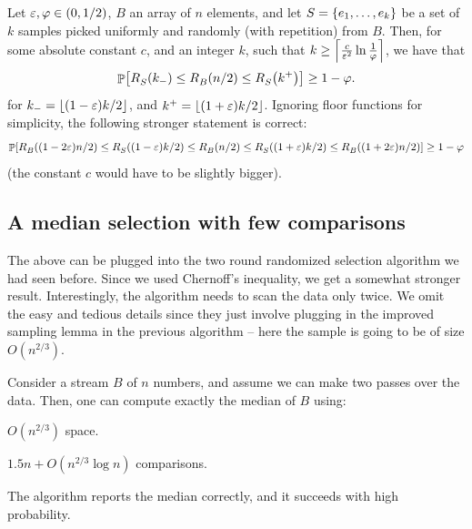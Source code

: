 \begin{lemma}
    Let ${\varepsilon}, \varphi \in (0,1/2)$, $B$ an array of $n$ elements, and let
    $S = \left\{ {e_1, \ldots, e_k} \right\}$ be a set of $k$ samples picked uniformly and
    randomly (with repetition) from $B$. Then, for some absolute constant
    $c$, and an integer $k$, such that
    $k\geq \left\lceil {\frac{c}{{\varepsilon}^2} \ln \frac{1}{\varphi}} \right\rceil $, we have that
    \begin{equation*}
        \Prob{%
           \rankY{S}{k_- }
           \leq
           \rankY{B}{n/2}
           \leq
           \rankY{S}{k^+} }
        \geq 1-\BadProb.
    \end{equation*}
    for $k_- = \left\lfloor {(1-{\varepsilon})k/2} \right\rfloor$, and $k^+ = \left\lfloor {(1+{\varepsilon})k/2} \right\rfloor$.  Ignoring
    floor functions for simplicity, the following stronger statement is correct:
    \begin{equation*}
        \Prob{%
           \rankY{B}{(1-2\eps)n/2}
           \leq %
           \rankY{S}{(1-\eps)k/2 }
           \leq
           \rankY{B}{n/2}
           \leq
           \rankY{S}{(1+\eps)k/2}
           \leq%
           \rankY{B}{(1+2\eps)n/2}
        }
      \geq 1-\BadProb        
    \end{equation*}
    (the constant $c$ would have to be slightly bigger).
\end{lemma}


\subsection{A median selection with few comparisons}

The above can be plugged into the two round randomized selection
algorithm we had seen before. Since we used Chernoff's inequality, we get
a somewhat stronger result. Interestingly, the algorithm needs to scan
the data only twice. We omit the easy and tedious details since they just
involve plugging in the improved sampling lemma in the previous
algorithm -- here the sample is going to be of size $O(n^{2/3})$.


\begin{lemma}
    Consider a stream $B$ of $n$ numbers, and assume we can make two
    passes over the data. Then, one can compute exactly the median of
    $B$ using:
    \begin{compactenumI}
        \item $O(n^{2/3})$ space.
        \item $1.5n + O(n^{2/3} \log n)$ comparisons.
    \end{compactenumI}
    The algorithm reports the median correctly, and it succeeds with
    high probability.
\end{lemma}

